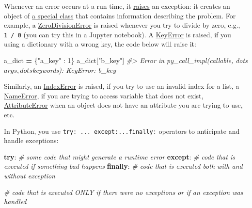 \documentclass[
]{book}
\newenvironment{Shaded}{\begin{snugshade}}{\end{snugshade}}
\newcommand{\CommentTok}[1]{\textcolor[rgb]{0.56,0.35,0.01}{\textit{#1}}}
\newcommand{\ControlFlowTok}[1]{\textcolor[rgb]{0.13,0.29,0.53}{\textbf{#1}}}
\newcommand{\DecValTok}[1]{\textcolor[rgb]{0.00,0.00,0.81}{#1}}
\newcommand{\NormalTok}[1]{#1}
\newcommand{\OperatorTok}[1]{\textcolor[rgb]{0.81,0.36,0.00}{\textbf{#1}}}
\newcommand{\StringTok}[1]{\textcolor[rgb]{0.31,0.60,0.02}{#1}}
\begin{document}
Whenever an error occurs at a run time, it \href{https://docs.python.org/3/reference/simple_stmts.html\#the-raise-statement}{raises} an exception: it creates an object of \href{https://docs.python.org/3/library/exceptions.html\#concrete-exceptions}{a special class} that contains information describing the problem. For example, a \href{https://docs.python.org/3/library/exceptions.html\#ZeroDivisionError}{ZeroDivisionError} is raised whenever you try to divide by zero, e.g., \texttt{1\ /\ 0} (you can try this in a Jupyter notebook). A \href{https://docs.python.org/3/library/exceptions.html\#KeyError}{KeyError} is raised, if you using a dictionary with a wrong key, the code below will raise it:

\begin{Shaded}
\begin{Highlighting}[]
\NormalTok{a\_dict }\OperatorTok{=}\NormalTok{ \{}\StringTok{"a\_key"}\NormalTok{ : }\DecValTok{1}\NormalTok{\}}
\NormalTok{a\_dict[}\StringTok{"b\_key"}\NormalTok{]}
\CommentTok{\#\textgreater{} Error in py\_call\_impl(callable, dots$args, dots$keywords): KeyError: \textquotesingle{}b\_key\textquotesingle{}}
\end{Highlighting}
\end{Shaded}

Similarly, an \href{https://docs.python.org/3/library/exceptions.html\#IndexError}{IndexError} is raised, if you try to use an invalid index for a list, a \href{https://docs.python.org/3/library/exceptions.html\#NameError}{NameError}, if you are trying to access variable that does not exist, \href{https://docs.python.org/3/library/exceptions.html\#AttributeError}{AttributeError} when an object does not have an attribute you are trying to use, etc.

In Python, you use \texttt{try:\ ...\ except:...finally:} operators to anticipate and handle exceptions:

\begin{Shaded}
\begin{Highlighting}[]
\ControlFlowTok{try}\NormalTok{:}
    \CommentTok{\# some code that might generate a runtime error}
\ControlFlowTok{except}\NormalTok{:  }
    \CommentTok{\# code that is executed if something bad happens}
\ControlFlowTok{finally}\NormalTok{:}
    \CommentTok{\# code that is executed both with and without exception}
    
\CommentTok{\# code that is executed ONLY if there were no exceptions or if an exception was handled}
\end{Highlighting}
\end{Shaded}
\end{document}
